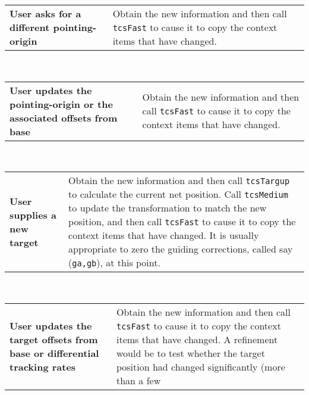 \documentclass[12pt,fleqn,twoside]{article}
\renewcommand{\_}{{\tt\char'137}}     %
\begin{document}
\begin{center}
\begin{tabular}{p{27ex}p{48ex}}
  \raggedright {\bf User asks
  for a different
  pointing-origin}           & \raggedright Obtain the new
                               information and then
                               call {\tt tcsFast} to cause it to copy the
                               context items that have changed. \\
\end{tabular}
\\[\medskipamount]
\begin{tabular}{p{27ex}p{48ex}}
  \raggedright {\bf User
  updates the
  pointing-origin or
  the associated
  offsets from base}         & \raggedright Obtain the new
                               information and then
                               call {\tt tcsFast} to cause it to copy the
                               context items that have changed. \\
\end{tabular}
\\[\medskipamount]
\begin{tabular}{p{27ex}p{48ex}}
  \raggedright {\bf User
  supplies a new
  target}                    & \raggedright Obtain the new
                               information and then
                               call {\tt tcsTargup} to calculate the
                               current net position.  Call {\tt tcsMedium}
                               to update the transformation to
                               match the new position, and then call
                               {\tt tcsFast} to cause it to copy the
                               context items that have changed.  It
                               is usually appropriate to zero the
                               guiding corrections, called say
                               ({\tt ga,gb}), at this point. \\
\end{tabular}
\\[\medskipamount]
\begin{tabular}{p{27ex}p{48ex}}
  \raggedright {\bf User
  updates the target
  offsets from base or
  differential tracking
  rates}                     & \raggedright Obtain the new
                               information and then
                               call {\tt tcsFast} to cause it to copy the
                               context items that have changed.  A
                               refinement would be to test whether
                               the target position had changed
                               significantly (more than a few

\end{tabular}
\end{center}
\end{document}
